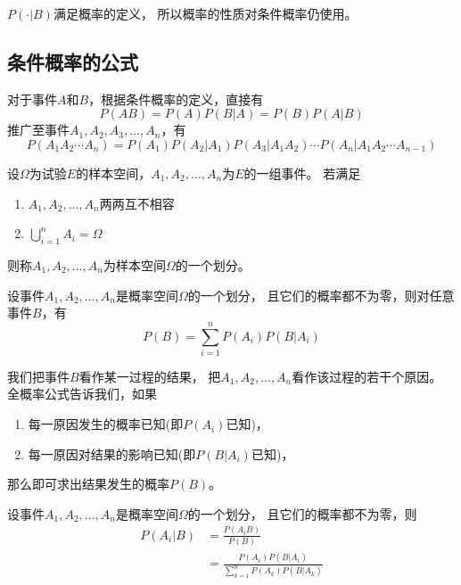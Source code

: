 \begin{remark}
  $P(\cdot|B)$满足概率的定义，
  所以概率的性质对条件概率仍使用。
\end{remark}

\subsection{条件概率的公式}
\begin{theorem}[乘法公式]
  对于事件$A$和$B$，根据条件概率的定义，直接有
  \begin{displaymath}
    P(AB) = P(A)P(B|A) = P(B)P(A|B)
  \end{displaymath}
  推广至事件$A_1,A_2,A_3,\dots,A_n$，有
  \begin{displaymath}
    P(A_1A_2\cdots A_n) = P(A_1)P(A_2|A_1)P(A_3|A_1A_2)
    \cdots P(A_n|A_1A_2\cdots A_{n-1})
  \end{displaymath}
\end{theorem}

\begin{definition}[样本空间的划分]
  设$\Omega$为试验$E$的样本空间，$A_1,A_2,\dots,A_n$为$E$的一组事件。
  若满足
  \begin{enumerate}
    \item
    $A_1,A_2,\dots,A_n$两两互不相容
    \item
    $\bigcup_{i=1}^n A_i = \Omega$
  \end{enumerate}
  则称$A_1,A_2,\dots,A_n$为样本空间$\Omega$的一个划分。
\end{definition}

\begin{theorem}[全概率公式]
  设事件$A_1,A_2,\dots,A_n$是概率空间$\Omega$的一个划分，
  且它们的概率都不为零，则对任意事件$B$，有
  \begin{displaymath}
    P(B) = \sum_{i=1}^nP(A_i)P(B|A_i)
  \end{displaymath}
\end{theorem}

\begin{remark}
  我们把事件$B$看作某一过程的结果，
  把$A_1,A_2,\dots,A_n$看作该过程的若干个原因。
  全概率公式告诉我们，如果
  \begin{enumerate}
    \item
    每一原因发生的概率已知(即$P(A_i)$已知)，
    \item
    每一原因对结果的影响已知(即$P(B|A_i)$已知)，
  \end{enumerate}
  那么即可求出结果发生的概率$P(B)$。
\end{remark}
\begin{theorem}[贝叶斯公式]
  设事件$A_1,A_2,\dots,A_n$是概率空间$\Omega$的一个划分，
  且它们的概率都不为零，则
  \begin{align*}
    P(A_i|B) &= \frac{P(A_iB)}{P(B)} \\
    &= \frac{P(A_i)P(B|A_i)}{\sum_{k=1}^n P(A_k)P(B|A_k)}
  \end{align*}
\end{theorem}


